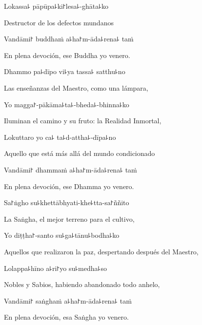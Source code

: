 Lokassa꜕ pāpūpa꜕ki꜓lesa꜕-ghāta꜕ko

\begin{english}
  Destructor de los defectos mundanos 
\end{english}

Vandāmi꜓ buddhaṁ a꜕ha꜓m-āda꜕rena꜕ taṁ

\begin{english}
  En plena devoción, ese Buddha yo venero.
\end{english}

Dhammo pa꜕dīpo vi꜕ya tassa꜕ satthu꜕no

\begin{english}
  Las enseñanzas del Maestro, como una lámpara,
\end{english}

Yo magga꜓-pākāma꜕ta꜕-bheda꜕-bhinna꜕ko

\begin{english}
  Iluminan el camino y su fruto: la Realidad Inmortal,
\end{english}

Lokuttaro yo ca꜕ ta꜕d-attha꜕-dīpa꜕no

\begin{english}
  Aquello que está más allá del mundo condicionado 
\end{english}

Vandāmi꜓ dhammaṁ a꜕ha꜓m-āda꜕rena꜕ taṁ

\begin{english}
  En plena devoción, ese Dhamma yo venero.
\end{english}

Sa꜓ṅgho su꜕khettābhyati-khe꜕tta-sa꜓ññito

\begin{english}
  La Saṅgha, el mejor terreno para el cultivo,
\end{english}

Yo diṭṭha꜓-santo su꜕ga꜕tānu꜕bodha꜕ko

\begin{english}
  Aquellos que realizaron la paz, despertando después del Maestro,
\end{english}

Lolappa꜕hīno a꜕ri꜓yo su꜕medha꜕so

\begin{english}
  Nobles y Sabios, habiendo abandonado todo anhelo, 
\end{english}

Vandāmi꜓ saṅghaṁ a꜕ha꜓m-āda꜕rena꜕ taṁ

\begin{english}
 En plena devoción, esa Saṅgha yo venero.
\end{english}

